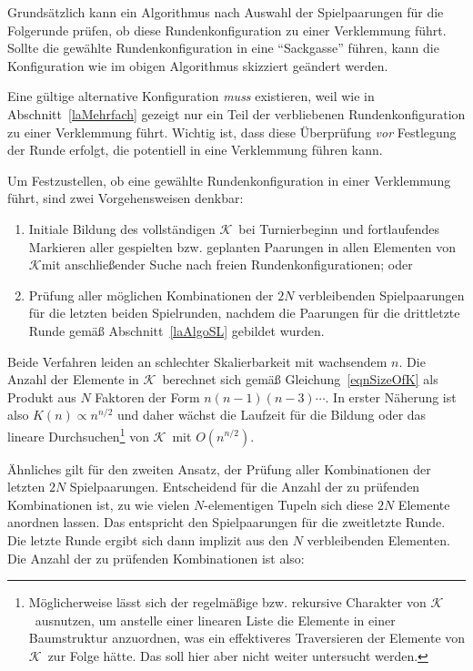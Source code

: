 \documentclass[DIV=15, 10pt]{scrartcl}
\newcommand{\KSet}{$\mathcal{K}$}
\begin{document}
Grundsätzlich kann ein Algorithmus nach Auswahl der Spielpaarungen für die Folgerunde prüfen, ob diese Rundenkonfiguration zu einer Verklemmung führt. Sollte die gewählte Rundenkonfiguration in eine "`Sackgasse"' führen, kann die Konfiguration wie im obigen Algorithmus skizziert geändert werden.

Eine gültige alternative Konfiguration \emph{muss} existieren, weil wie in Abschnitt~\ref{laMehrfach} gezeigt nur ein Teil der verbliebenen Rundenkonfiguration zu einer Verklemmung führt. Wichtig ist, dass diese Überprüfung \emph{vor} Festlegung der Runde erfolgt, die potentiell in eine Verklemmung führen kann.

Um Festzustellen, ob eine gewählte Rundenkonfiguration in einer Verklemmung führt, sind zwei Vorgehensweisen denkbar:

\begin{enumerate}

\item Initiale Bildung des vollständigen \KSet\ bei Turnierbeginn und fortlaufendes Markieren aller gespielten bzw. geplanten Paarungen in allen Elementen von \KSet mit anschließender Suche nach freien Rundenkonfigurationen; oder

\item Prüfung aller möglichen Kombinationen der $2N$ verbleibenden Spielpaarungen für die letzten beiden Spielrunden, nachdem die Paarungen für die drittletzte Runde gemäß Abschnitt~\ref{laAlgoSL} gebildet wurden.

\end{enumerate}

Beide Verfahren leiden an schlechter Skalierbarkeit mit wachsendem $n$. Die Anzahl der Elemente in \KSet\ berechnet sich gemäß Gleichung~\eqref{eqnSizeOfK} als Produkt aus $N$ Faktoren der Form $n(n-1)(n-3)\cdots$. In erster Näherung ist also $K(n) \propto n^{n/2}$ und daher wächst die Laufzeit für die Bildung oder das lineare Durchsuchen\footnote{Möglicherweise lässt sich der regelmäßige bzw. rekursive Charakter von \KSet\ ausnutzen, um anstelle einer linearen Liste die Elemente in einer Baumstruktur anzuordnen, was ein effektiveres Traversieren der Elemente von \KSet\ zur Folge hätte. Das soll hier aber nicht weiter untersucht werden.} von \KSet\ mit $O(n^{n/2})$.

Ähnliches gilt für den zweiten Ansatz, der Prüfung aller Kombinationen der letzten $2N$ Spielpaarungen. Entscheidend für die Anzahl der zu prüfenden Kombinationen ist, zu wie vielen $N$-elementigen Tupeln sich diese $2N$ Elemente anordnen lassen. Das entspricht den Spielpaarungen für die zweitletzte Runde. Die letzte Runde ergibt sich dann implizit aus den $N$ verbleibenden Elementen. Die Anzahl der zu prüfenden Kombinationen ist also:
\end{document}
